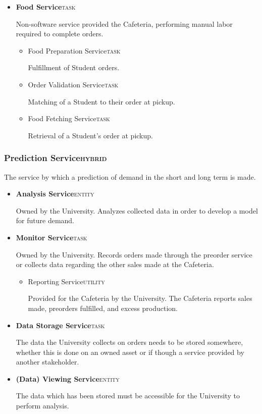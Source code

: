 \documentclass[11pt]{article}
\begin{document}
\begin{itemize}
\item \textbf{Food Service}\hfill{}\textsc{task}
\label{sec:org1843914}

Non-software service provided the Cafeteria, performing manual
labor required to complete orders.

\begin{itemize}
\item Food Preparation Service\hfill{}\textsc{task}
\label{sec:org52b405e}

Fulfillment of Student orders.

\item Order Validation Service\hfill{}\textsc{task}
\label{sec:org4e81586}

Matching of a Student to their order at pickup.

\item Food Fetching Service\hfill{}\textsc{task}
\label{sec:org8dd62e0}

Retrieval of a Student's order at pickup.
\end{itemize}
\end{itemize}

\subsubsection*{Prediction Service\hfill{}\textsc{hybrid}}
\label{sec:org77fb842}
The service by which a prediction of demand in the short and long
term is made.
\begin{itemize}
\item \textbf{Analysis Service}\hfill{}\textsc{entity}
\label{sec:orgac675ae}

Owned by the University. Analyzes collected data in order to
develop a model for future demand.

\item \textbf{Monitor Service}\hfill{}\textsc{task}
\label{sec:orgbe9166f}

Owned by the University. Records orders made through the preorder
service or collects data regarding the other sales made at the
Cafeteria.

\begin{itemize}
\item Reporting Service\hfill{}\textsc{utility}
\label{sec:org2ba7fd9}

Provided for the Cafeteria by the University. The Cafeteria
reports sales made, preorders fulfilled, and excess production.
\end{itemize}

\item \textbf{Data Storage Service}\hfill{}\textsc{task}
\label{sec:org071fd4d}

The data the University collects on orders needs to be stored
somewhere, whether this is done on an owned asset or if though a
service provided by another stakeholder.

\item \textbf{(Data) Viewing Service}\hfill{}\textsc{entity}
\label{sec:org2fc3c0f}

The data which has been stored must be accessible for the
University to perform analysis.
\end{itemize}
\end{document}
